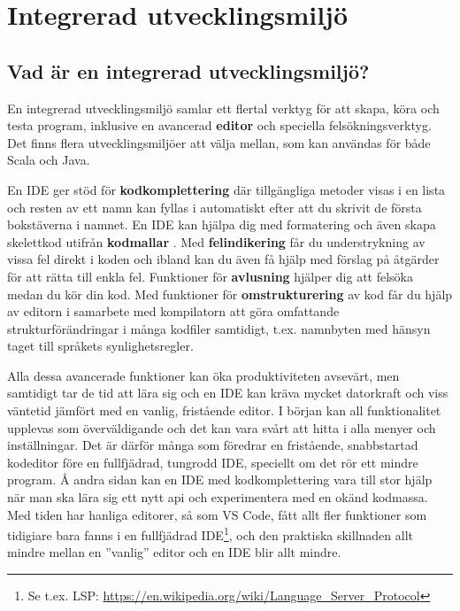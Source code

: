 
\chapter{Integrerad utvecklingsmiljö}\label{appendix:ide}

\section{Vad är en integrerad utvecklingsmiljö?}

En integrerad utvecklingsmiljö  samlar ett flertal verktyg för att skapa, köra och testa program, inklusive en avancerad \textbf{editor} och speciella felsökningsverktyg. %
 Det finns flera utvecklingsmiljöer att välja mellan, som kan användas för både Scala och Java.

En IDE ger stöd för \textbf{kodkomplettering}  där tillgängliga metoder visas i en lista och resten av ett namn kan fyllas i automatiskt efter att du skrivit de första bokstäverna i namnet. En IDE kan hjälpa dig med formatering och även skapa skelettkod utifrån \textbf{kodmallar} . Med \textbf{felindikering}  får du understrykning av vissa fel direkt i koden och ibland kan du även få hjälp med förslag på åtgärder för att rätta till enkla fel. Funktioner för \textbf{avlusning}  hjälper dig att felsöka medan du kör din kod. Med funktioner för \textbf{omstrukturering}  av kod får du hjälp av editorn i samarbete med kompilatorn att göra omfattande strukturförändringar i många kodfiler samtidigt, t.ex. namnbyten med hänsyn taget till språkets synlighetsregler.

Alla dessa avancerade funktioner kan öka produktiviteten avsevärt, men samtidigt tar de tid att lära sig och en IDE kan kräva mycket datorkraft och viss väntetid jämfört med en vanlig, fristående editor. I början kan all funktionalitet upplevas som överväldigande och det kan vara svårt att hitta i alla menyer och inställningar. Det är därför många som föredrar en fristående, snabbstartad kodeditor före en fullfjädrad, tungrodd IDE, speciellt om det rör ett mindre program. Å andra sidan kan en IDE med kodkomplettering vara till stor hjälp när man ska lära sig ett nytt api och experimentera med en okänd kodmassa. Med tiden har hanliga editorer, så som VS Code, fått allt fler  funktioner som tidigiare bara fanns i en fullfjädrad IDE\footnote{Se t.ex. LSP: \url{https://en.wikipedia.org/wiki/Language_Server_Protocol}}, och den praktiska skillnaden allt mindre mellan en ''vanlig'' editor och en IDE blir allt mindre.

